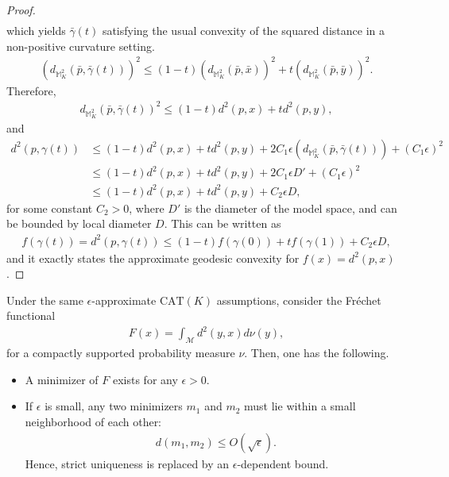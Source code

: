 \begin{proof}
\begin{align*}
    \end{align*}
    which yields $\bar{\gamma}(t)$ satisfying the usual convexity of the squared distance in a non-positive curvature setting.
    \begin{align*}
        \left(d_{\mathbb{M}_K^2}(\bar{p}, \bar{\gamma}(t))\right)^2 \leq (1 - t)\left(d_{\mathbb{M}_K^2}(\bar{p}, \bar{x})\right)^2 + t\left(d_{\mathbb{M}_K^2}(\bar{p}, \bar{y})\right)^2.
    \end{align*}
    Therefore,
    \begin{align*}
        d_{\mathbb{M}_K^2}(\bar{p}, \bar{\gamma}(t))^2 \leq (1 - t)d^2(p, x) + t d^2(p, y),
    \end{align*}
    and
    \begin{align*}
        d^2(p, \gamma(t)) &\leq (1 - t)d^2(p, x) + t d^2(p, y) + 2 C_1 \epsilon \left(d_{\mathbb{M}_K^2}(\bar{p}, \bar{\gamma}(t))\right) + (C_1 \epsilon)^2 \\
        &\leq (1 - t)d^2(p, x) + t d^2(p, y) + 2 C_1 \epsilon D' + (C_1 \epsilon)^2 \\
        &\leq (1 - t)d^2(p, x) + t d^2(p, y) + C_2 \epsilon D,
    \end{align*}
    for some constant $C_2 > 0$, where $D'$ is the diameter of the model space, and can be bounded by local diameter $D$.
    This can be written as
    \begin{align*}
        f(\gamma(t)) = d^2(p, \gamma(t)) \leq (1 - t) f(\gamma(0)) + t f(\gamma(1)) + C_2 \epsilon D,
    \end{align*}
    and it exactly states the approximate geodesic convexity for $f(x) = d^2(p, x)$.
\end{proof}
\begin{corollary}
    Under the same $\epsilon$-approximate $\mathrm{CAT}(K)$ assumptions, consider the Fréchet functional
    \begin{align}
        F(x) = \int_\mathcal{M} d^2(y, x) d\nu(y),
    \end{align}
    for a compactly supported probability measure $\nu$.
    Then, one has the following.
    \begin{itemize}
        \item  A minimizer of $F$ exists for any $\epsilon > 0$.
        \item If $\epsilon$ is small, any two minimizers $m_1$ and $m_2$ must lie within a small neighborhood of each other:
        \begin{align}
            d(m_1, m_2) \leq O(\sqrt{\epsilon}).
        \end{align}
        Hence, strict uniqueness is replaced by an $\epsilon$-dependent bound.
    \end{itemize}
\end{corollary}
